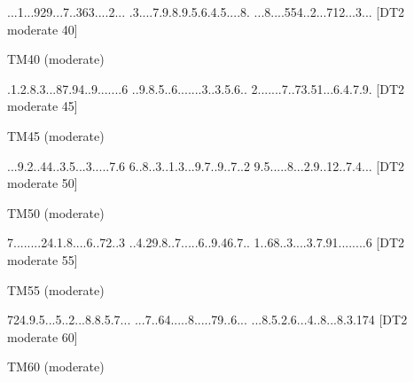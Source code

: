 \documentclass[twoside]{article}
\begin{document}
\renewcommand*{\puzzlefile}{tm40.sud}
\writepuzzle%
{...1...92}{9...7..36}{3....2...}%
{.3....7.9}{.8.9.5.6.}{4.5....8.}%
{...8....5}{54..2...7}{12...3...}%
[DT2 moderate 40]
\vfill
\begin{minipage}{0.95\linewidth}\begin{center}
TM40 (moderate) \\
\end{center}\end{minipage}

\renewcommand*{\puzzlefile}{tm45.sud}
\writepuzzle%
{.1.2.8.3.}{..87.94..}{9.......6}%
{..9.8.5..}{6.......3}{..3.5.6..}%
{2.......7}{..73.51..}{.6.4.7.9.}%
[DT2 moderate 45]
\vfill
\begin{minipage}{0.95\linewidth}\begin{center}
TM45 (moderate) \\
\end{center}\end{minipage}

\renewcommand*{\puzzlefile}{tm50.sud}
\writepuzzle%
{...9.2..4}{4..3.5...}{3.....7.6}%
{6..8..3..}{1.3...9.7}{..9..7..2}%
{9.5.....8}{...2.9..1}{2..7.4...}%
[DT2 moderate 50]
\vfill
\begin{minipage}{0.95\linewidth}\begin{center}
TM50 (moderate) \\
\end{center}\end{minipage}

\renewcommand*{\puzzlefile}{tm55.sud}
\writepuzzle%
{7........}{24.1.8...}{.6..72..3}%
{..4.29.8.}{.7.....6.}{.9.46.7..}%
{1..68..3.}{...3.7.91}{........6}%
[DT2 moderate 55]
\vfill
\begin{minipage}{0.95\linewidth}\begin{center}
TM55 (moderate) \\
\end{center}\end{minipage}

\renewcommand*{\puzzlefile}{tm60.sud}
\writepuzzle%
{724.9.5..}{.5..2...8}{.8.5.7...}%
{...7..64.}{....8....}{.79..6...}%
{...8.5.2.}{6...4..8.}{..8.3.174}%
[DT2 moderate 60]
\vfill
\begin{minipage}{0.95\linewidth}\begin{center}
TM60 (moderate) \\
\end{center}\end{minipage}
\end{document}
